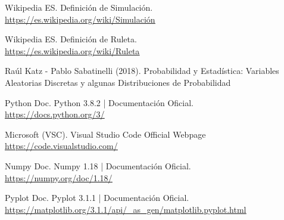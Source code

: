 \documentclass[a4paper]{article}
\begin{document}
\newpage
  
\begin{thebibliography}{1}

    Wikipedia ES.
    \newblock Definición de Simulación. \\
    \newblock \underline{\url{https://es.wikipedia.org/wiki/Simulación}}

    Wikipedia ES.
    \newblock Definición de Ruleta. \\
    \newblock \underline{\url{https://es.wikipedia.org/wiki/Ruleta}}

    Raúl Katz - Pablo Sabatinelli (2018).
    \newblock Probabilidad y Estadística: Variables Aleatorias Discretas y algunas Distribuciones de Probabilidad

    Python Doc.
    \newblock Python 3.8.2 | Documentación Oficial. \\
    \newblock \underline{\url{https://docs.python.org/3/}}

    Microsoft (VSC).
    \newblock Visual Studio Code Official Webpage \\
    \newblock \underline{\url{https://code.visualstudio.com/}}

    Numpy Doc.
    \newblock Numpy 1.18 | Documentación Oficial. \\
    \newblock \underline{\url{https://numpy.org/doc/1.18/}}

    Pyplot Doc.
    \newblock Pyplot 3.1.1 | Documentación Oficial. \\
    \newblock \underline{\url{https://matplotlib.org/3.1.1/api/\_as\_gen/matplotlib.pyplot.html}}

\end{thebibliography}
\end{document}
